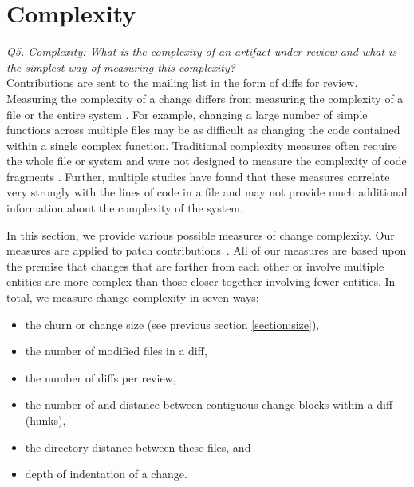 \section{Complexity}
\label{section:complexity}
\textit{Q5. Complexity: What is the complexity of an artifact under review and what is the simplest way of measuring this complexity?}\\

Contributions are sent to the mailing list in the form of diffs for review.
Measuring the complexity of a change differs from measuring the complexity of a
file or the entire system \cite{German2005SM}. For example, changing a large
number of simple functions across multiple files may be as difficult as
changing the code contained within a single complex function.
%
Traditional complexity measures often require the whole file or system and were
not designed to measure the complexity of code fragments \cite{Hindle2008ICPC}.
Further, multiple studies have found that these measures correlate very
strongly with the lines of code in a file
\cite{Graves2000IEEE,Leszak2002JSS,Herraiz2007MSR} and may not provide much
additional information about the complexity of the system.

In this section, we provide various possible measures of change complexity.
Our measures are applied to patch contributions~\cite{German2005SM}.
%
All of our measures are based upon the premise that changes that are farther
from each other or involve multiple entities are more complex than those closer
together involving fewer entities. 
%
In total, we measure change complexity in seven ways:

\begin{itemize}

\item  the churn or change size (see previous section \ref{section:size}), 

\item the number of modified files in a diff, 

\item the number of diffs per review, 

\item the number of and distance between contiguous change blocks within a diff
(\ie hunks), 

\item the directory distance between these files, and 

\item depth of indentation of a change. 

\end{itemize}

